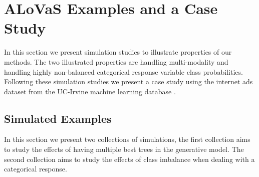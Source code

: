 \section{ALoVaS Examples and a Case Study}\label{sec:Examples}

In this section we present simulation studies to illustrate properties of our methods. The two illustrated properties are handling multi-modality and handling highly non-balanced categorical response variable class probabilities. Following these simulation studies we present a case study using the internet ads dataset from the UC-Irvine machine learning database \cite{Frank:2010uq}. 

	\subsection{Simulated Examples}
	In this section we present two collections of simulations, the first collection aims to study the effects of having multiple best trees in the generative model. The second collection aims to study the effects of class imbalance when dealing with a categorical response. 
	
